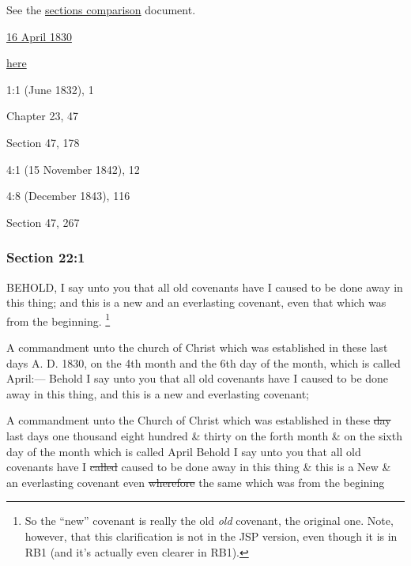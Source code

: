 		See the \href{https://drive.google.com/file/d/1goAvNz8jS4R8slYfMG_db55Ty2z_vmgK/view?usp=sharing}{sections comparison} document.
	
		\begin{compactdesc}
			\item[JSP] \hyperref[EMS-1830-JS-16-APR-1830]{16 April 1830}
			\item[RB1] \hyperref[EXSS-DC22-RB1]{here}
			\item[EMS] 1:1 (June 1832), 1
			\item[BC] Chapter 23, 47
			\item[DC 1835] Section 47, 178
			\item[TS] 4:1 (15 November 1842), 12
			\item[MS] 4:8 (December 1843), 116
			\item[DC 1844] Section 47, 267
		\end{compactdesc}

	\subsubsection{Section 22:1} %
		\label{DC22-1}

		BEHOLD, I say unto you that all old covenants have I caused to be done away in this thing; and this is a new and an everlasting covenant, even that which was from the beginning.%
			\footnote{%
				So the ``new'' covenant is really the old \textit{old} covenant, the original one. Note, however, that this clarification is not in the JSP version, even though it is in RB1 (and it's actually even clearer in RB1).
				}

		\begin{framed}
		\scriptsize
			\begin{compactdesc}
				\item[JSP] A commandment unto the church of Christ which was established in these last days A. D. 1830, on the 4th month and the 6th day of the month, which is called April:--- Behold I say unto you that all old covenants have I caused to be done away in this thing, and this is a new and everlasting covenant;
				\item[RB1] A commandment unto the Church of Christ which was established in these \sout{day} last days one thousand eight hundred \& thirty on the forth month \& on the sixth day of the month which is called April Behold I say unto you that all old covenants have I \sout{called} caused to be done away in this thing \& this is a New \& an everlasting covenant even \sout{wherefore} the same which was from the begining
			\end{compactdesc}
		\end{framed}

